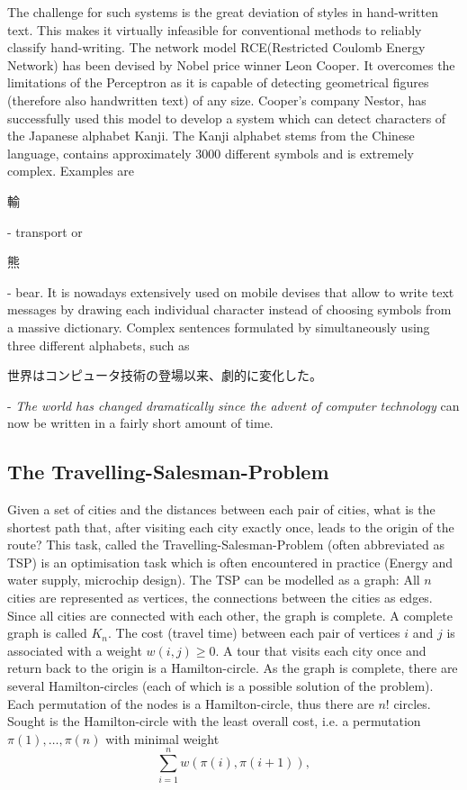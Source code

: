 \documentclass[10pt,a4paper,DIV=11]{scrreprt}
\begin{document}
The challenge for such systems is the great deviation of styles in hand-written text. This makes it virtually infeasible for conventional methods to reliably classify hand-writing. 
The network model RCE(Restricted Coulomb Energy Network) has been devised by Nobel price winner Leon Cooper. It overcomes the limitations of the Perceptron as it is capable of 
detecting geometrical figures (therefore also handwritten text) of any size. 
Cooper's company Nestor, has successfully used this model to develop a system which can detect characters of the Japanese alphabet Kanji. The Kanji alphabet stems from the 
Chinese language, contains approximately 3000 different symbols and is extremely complex. 
Examples are \begin{CJK}{UTF8}{min}輸\end{CJK} - transport or \begin{CJK}{UTF8}{min}熊\end{CJK} - bear. It is nowadays extensively used on mobile devises that allow to 
write text messages by drawing each individual character instead of choosing symbols from a massive dictionary. 
Complex sentences formulated by simultaneously using three different alphabets, such as \begin{CJK}{UTF8}{min}世界はコンピュータ技術の登場以来、劇的に変化した。\end{CJK} 
 - \textit{The world has changed dramatically since the advent of computer technology} can now be written in a fairly short amount of time.

\subsection{The Travelling-Salesman-Problem}
Given a set of cities and the distances between each pair of cities, what is the shortest path that, after visiting each city exactly once, leads to the origin of the route? 
This task, called the Travelling-Salesman-Problem (often abbreviated as TSP) is an optimisation task which is often encountered in practice (Energy and water supply, microchip 
design). The TSP can be modelled as a graph: All $n$ cities are represented as vertices, the connections between the cities as edges. Since all cities are connected with each 
other, the graph is complete. A complete graph is called $K_n$. The cost (travel time) between each pair of vertices $i$ and $j$ is associated with a weight $w(i,j) \geq 0$. 
A tour that visits each city once and return back to the origin is a Hamilton-circle. As the graph is complete, there are several Hamilton-circles (each of which is a possible 
solution of the problem). Each permutation of the nodes is a Hamilton-circle, thus there are $n!$ circles. Sought is the Hamilton-circle with the least overall cost, i.e. a 
permutation $\pi(1),\dots,\pi(n)$ with minimal weight
\begin{equation}
    \sum\limits_{i=1}^n w(\pi(i),\pi(i+1)), 
\end{equation}
\end{document}
